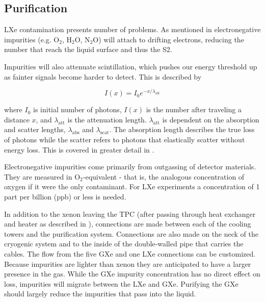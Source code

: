 \subsection{Purification}
\label{subsec:xenon1t_pur}
LXe contamination presents number of problems.  As mentioned in  electronegative
impurities (e.g. O$_2$, H$_2$O, N$_2$O) will attach to drifting electrons, reducing the number that reach
the liquid surface and thus the S2.

Impurities will also attenuate scintillation, which pushes our energy threshold up as fainter signals become harder to detect.  This is
described by

\begin{equation}
I(x) = I_0 e^{-x / \lambda_{\mathrm{att}}}
\label{eq:xenon1t_pur_atten}
\end{equation}

\noindent where $I_0$ is initial number of photons, $I(x)$ is the number after traveling a distance $x$, and $\lambda_{\mathrm{att}}$ is
the
attenuation length.  $\lambda_{\mathrm{att}}$ is dependent on the absorption and scatter lengths, $\lambda_{\mathrm{abs}}$ and
$\lambda_{\mathrm{scat}}$.  The absorption length describes the true loss of photons while the scatter refers to photons that elastically
scatter without energy loss.  This is covered in greater detail in .

Electronegative impurities come primarily from outgassing of detector materials.  They are measured in O$_2$-equivalent - that is, the
analogous concentration of oxygen if it
were the only contaminant.  For LXe experiments a concentration of 1 part per billion (ppb) or less is needed.

In addition to the xenon leaving the TPC (after passing through heat exchanger and heater as described in ),
connections are made between
each of the cooling towers and the purification system.  Connections are also made on the neck of the cryogenic system and to the
inside of the double-walled pipe that carries the cables.  The flow from the five GXe and one LXe connections can be customized.  Because
impurities are lighter than xenon they are anticipated to have a larger
presence in the gas.  While the GXe impurity concentration has no direct effect on \electron loss, impurities will migrate between the
LXe and GXe.  Purifying the GXe should largely reduce the impurities that pass into the liquid.


